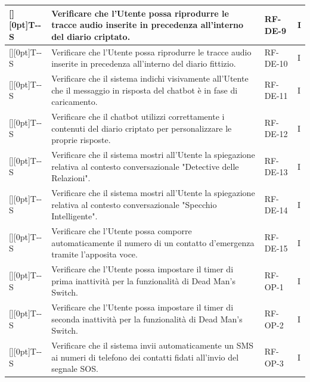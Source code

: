 \documentclass[a4paper,12pt]{article}
\newcounter{testsys}
\newcommand{\systestcode}{%
  \raisebox{0pt}[\height][0pt]{\hypertarget{T-\arabic{testsys}-S}{}}T-\arabic{testsys}-S%
}
\begin{document}
\begin{longtable}{| >{\centering\arraybackslash}p{} | >{\raggedright\arraybackslash}p{} | >{\centering\arraybackslash}p{} | >{\centering\arraybackslash}p{} |}
\stepcounter{testsys} \systestcode & Verificare che l'Utente possa riprodurre le tracce audio inserite in precedenza all'interno del diario criptato. & RF-DE-9 & I \\
\hline

\stepcounter{testsys} \systestcode & Verificare che l'Utente possa riprodurre le tracce audio inserite in precedenza all'interno del diario fittizio. & RF-DE-10 & I \\
\hline

\stepcounter{testsys} \systestcode & Verificare che il sistema indichi visivamente all'Utente che il messaggio in risposta del chatbot è in fase di caricamento. & RF-DE-11 & I \\
\hline

\stepcounter{testsys} \systestcode & Verificare che il chatbot utilizzi correttamente i contenuti del diario criptato per personalizzare le proprie risposte. & RF-DE-12 & I \\
\hline

\stepcounter{testsys} \systestcode & Verificare che il sistema mostri all'Utente la spiegazione relativa al contesto conversazionale "Detective delle Relazioni". & RF-DE-13 & I \\
\hline

\stepcounter{testsys} \systestcode & Verificare che il sistema mostri all'Utente la spiegazione relativa al contesto conversazionale "Specchio Intelligente". & RF-DE-14 & I \\
\hline

\stepcounter{testsys} \systestcode & Verificare che l'Utente possa comporre automaticamente il numero di un contatto d'emergenza tramite l'apposita voce. & RF-DE-15 & I \\
\hline

\stepcounter{testsys} \systestcode & Verificare che l'Utente possa impostare il timer di prima inattività per la funzionalità di Dead Man's Switch. & RF-OP-1 & I \\
\hline

\stepcounter{testsys} \systestcode & Verificare che l'Utente possa impostare il timer di seconda inattività per la funzionalità di Dead Man's Switch. & RF-OP-2 & I \\
\hline

\stepcounter{testsys} \systestcode & Verificare che il sistema invii automaticamente un SMS ai numeri di telefono dei contatti fidati all'invio del segnale SOS. & RF-OP-3 & I \\
\hline


\end{longtable}
\end{document}
